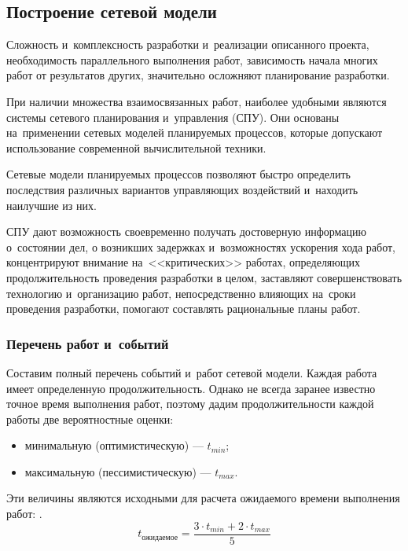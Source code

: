 
\subsection{Построение сетевой модели}

Сложность и~комплексность разработки и~реализации описанного проекта, 
необходимость параллельного выполнения работ, 
зависимость начала многих работ от результатов других, 
значительно осложняют планирование разработки.

При наличии множества взаимосвязанных работ,
наиболее удобными являются системы сетевого планирования и~управления (СПУ).
Они основаны на~применении сетевых моделей планируемых процессов, 
которые допускают использование современной вычислительной техники. 

Сетевые модели планируемых процессов позволяют быстро определить 
последствия различных вариантов управляющих 
воздействий и~находить наилучшие из них. 

СПУ дают возможность своевременно получать достоверную информацию о~состоянии дел, 
о возникших задержках и~возможностях ускорения хода работ, 
концентрируют внимание на~<<критических>> работах, 
определяющих продолжительность проведения разработки в целом, 
заставляют совершенствовать технологию и~организацию работ, 
непосредственно влияющих на~сроки проведения разработки, 
помогают составлять рациональные планы работ.

\subsubsection{Перечень работ и~событий}

Составим полный перечень событий и~работ сетевой модели. 
Каждая работа имеет определенную продолжительность. 
Однако не всегда заранее известно точное время выполнения работ, 
поэтому дадим продолжительности каждой работы две вероятностные оценки:   

\begin{itemize}
	\item минимальную (оптимистическую) --- $t_{min}$;
	\item максимальную (пессимистическую) --- $t_{max}$.
\end{itemize}

Эти величины являются исходными для расчета ожидаемого времени выполнения работ:  .
\[
	t_{\text{ожидаемое}} = \dfrac{3 \cdot t_{min} + 2 \cdot t_{max} }{5}
\]

